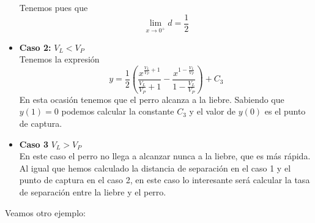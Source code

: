 \begin{example}
\begin{itemize}
Tenemos pues que $$\lim_{x\to 0^+} d = \frac{1}{2}$$
\item \textbf{Caso 2:} $V_L \lt V_P$\\
Tenemos la expresión $$y=\frac{1}{2}(\frac{x^{\frac{V_L}{V_P}+1}}{\frac{V_L}{V_P}+1}-\frac{x^{1-\frac{V_L}{V_P}}}{1-\frac{V_L}{V_P}})+C_3$$
En esta ocasión tenemos que el perro alcanza a la liebre. Sabiendo que $y(1) = 0$ podemos calcular la constante $C_3$ y el valor de $y(0)$ es el punto de captura.
\item \textbf{Caso 3} $V_L \gt V_P$\\
En este caso el perro no llega a alcanzar nunca a la liebre, que es más rápida. Al igual que hemos calculado la distancia de separación en el caso 1 y el punto de captura en el caso 2, en este caso lo interesante será calcular la tasa de separación entre la liebre y el perro.
\end{itemize}
\end{example}

Veamos otro ejemplo:

